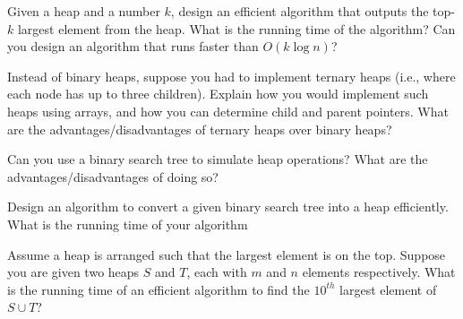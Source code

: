 \documentclass[addpoints,12pt]{exam}
\begin{document}
\begin{questions}

\question
Given a heap and a number $k$, design an efficient algorithm that outputs the top-$k$ largest 
element from the heap. What is the running time of the algorithm? Can you design an algorithm
that runs faster than $O(k \log n)$? 

\question
Instead of binary heaps, suppose you had to implement ternary heaps (i.e., where each node has 
up to three children). Explain how you would implement such heaps using arrays, and how you 
can determine child and parent pointers. What are the advantages/disadvantages of ternary 
heaps over binary heaps?

\question
Can you use a binary search tree to simulate heap operations? What are the 
advantages/disadvantages of doing so?

\question
Design an algorithm to convert a given binary search tree into a heap efficiently. What is the 
running time of your algorithm

\question
Assume a heap is arranged such that the largest element is on the top. Suppose you are given 
two heaps $S$ and $T$, each with $m$ and $n$ elements respectively. What is the running time of an 
efficient algorithm to find the $10^{th}$ largest element of $S \cup T$?

\end{questions}
\end{document}
